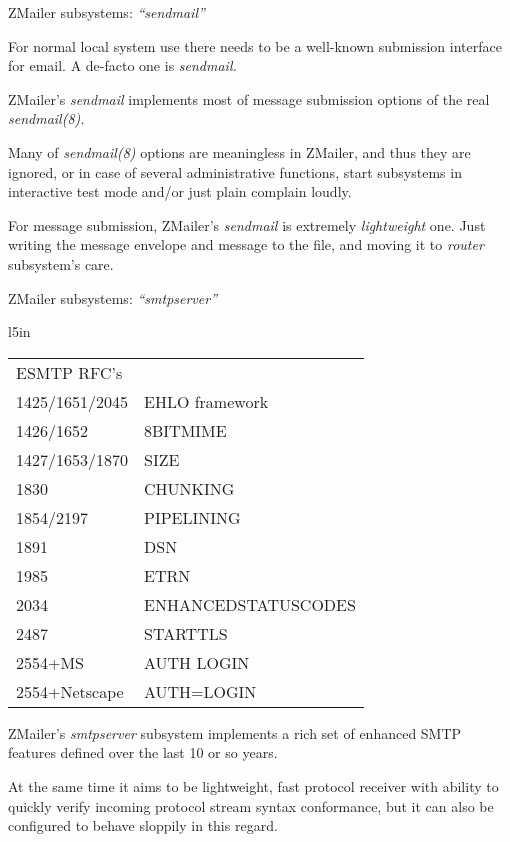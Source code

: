 \documentclass[a4paper,landscape]{slides}
\newcommand{\ZM}{ZMailer}
\begin{document}


\begin{slide}

\centerline{\large \ZM{} subsystems: {\it ``sendmail''}}

For normal local system use there needs to be a well-known
submission interface for email.  A de-facto one is {\it sendmail.}

\ZM's {\it sendmail} implements most of message submission options
of the real {\it sendmail(8).}

Many of {\it sendmail(8)} options are meaningless in \ZM{}, and thus
they are ignored, or in case of several administrative functions,
start subsystems in interactive test mode and/or just plain complain
loudly.

For message submission, \ZM's {\it sendmail} is extremely
{\it lightweight} one.  Just writing the message envelope and
message to the file, and moving it to {\it router} subsystem's care.



\vfill

\end{slide}



\begin{slide}

\centerline{\large \ZM{} subsystems: {\it ``smtpserver''}}

\begin{wrapfigure}{l}{5in}
\tiny
\begin{tabular}{ll}
ESMTP RFC's \\
1425/1651/2045 & EHLO framework \\
1426/1652 & 8BITMIME \\
1427/1653/1870 & SIZE \\
1830 & CHUNKING \\
1854/2197 & PIPELINING \\
1891 & DSN \\
1985 & ETRN \\
2034 & ENHANCEDSTATUSCODES \\
2487 & STARTTLS \\
2554+MS & AUTH LOGIN \\
2554+Netscape & AUTH=LOGIN
\end{tabular}
\end{wrapfigure}
\ZM's {\it smtpserver} subsystem implements a rich set of enhanced SMTP
features defined over the last 10 or so years.

At the same time it aims to be lightweight, fast protocol receiver with
ability to quickly verify incoming protocol stream syntax conformance,
but it can also be configured to behave sloppily in this regard.

\vfill

\end{slide}
\end{document}
